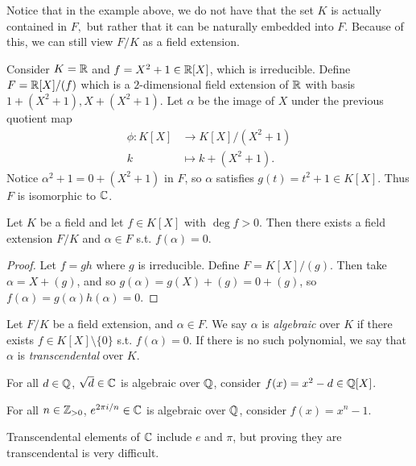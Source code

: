 \begin{remark}
    Notice that in the example above, we do not have that the set $K$ is actually contained in $F,$ but rather that it can be naturally embedded into $F.$ Because of this, we can still view $F/K$ as a field extension.
\end{remark}

\begin{example}
  Consider $K=\mathbb R$ and $f=X^2+1\in \mathbb R[X]$, which is irreducible. Define $F=\mathbb R[X]/(f)$
  which is a $2$-dimensional field extension of $\mathbb R$ with basis $1+(X^2+1), X+(X^2+1)$. Let $\alpha$ be the image
  of $X$ under the previous quotient map
  \begin{align*}
      \phi: K[X] &\to K[X]/(X^2+1) \\
      k &\mapsto k + (X^2+1).
  \end{align*}
  Notice $\alpha^2+1=0 + (X^2+1)$ in
  $F$, so $\alpha$ satisfies $g(t)=t^2+1\in K[X]$. Thus $F$ is isomorphic to $\mathbb C$.
\end{example}

\begin{theorem}
  Let $K$ be a field and let $f\in K[X]$ with $\deg f>0$. Then there exists a field
  extension $F/K$ and $\alpha \in F$ s.t. $f(\alpha)=0$.
\end{theorem}
\begin{proof}
  Let $f=gh$ where $g$ is irreducible. Define $F=K[X]/(g)$. Then take $\alpha=X+(g)$, and so $g(\alpha)=g(X)+(g)=0+(g)$, so $f(\alpha) = g(\alpha)h(\alpha)=0$.
\end{proof}

\begin{definition}
  Let $F/K$ be a field extension, and $\alpha\in F$. We say $\alpha$ is \emph{algebraic} over
  $K$ if there exists $f\in K[X]\setminus \{0\}$ s.t. $f(\alpha)=0$. If there is no such
  polynomial, we say that $\alpha$ is \emph{transcendental} over $K$.
\end{definition}

\begin{example}
  For all $d\in \mathbb Q$, $\sqrt{d}\in\mathbb C$ is algebraic over $\mathbb Q$, consider
  $f(x)=x^2-d\in\mathbb Q[X]$.

  For all $n\in\mathbb Z_{>0}$, $e^{2\pi i/n}\in \mathbb C$ is algebraic over $\mathbb Q$, consider
  $f(x)=x^n-1$.

  Transcendental elements of $\mathbb C$ include $e$ and $\pi$, but proving they are transcendental is very difficult.
\end{example}

